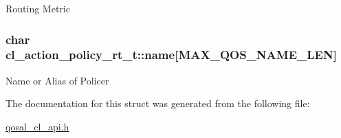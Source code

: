 Routing Metric \hypertarget{structcl__action__policy__rt__t_ad03f755c9640e2ac211250c92bef5472}{
\subsubsection[{name}]{\setlength{\rightskip}{0pt plus 5cm}char cl\-\_\-action\-\_\-policy\-\_\-rt\-\_\-t\-::name\mbox{[}{\bf M\-A\-X\-\_\-\-Q\-O\-S\-\_\-\-N\-A\-M\-E\-\_\-\-L\-E\-N}\mbox{]}}}\label{structcl__action__policy__rt__t_ad03f755c9640e2ac211250c92bef5472}
Name or Alias of Policer 

The documentation for this struct was generated from the following file\-:\begin{DoxyCompactItemize}
\item 
\hyperlink{qosal__cl__api_8h}{qosal\-\_\-cl\-\_\-api.\-h}\end{DoxyCompactItemize}
